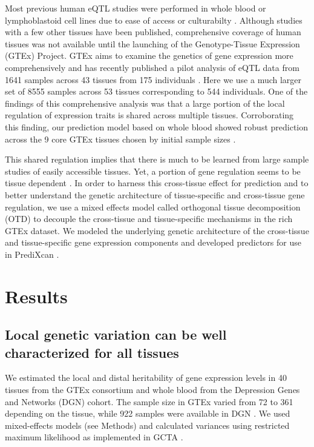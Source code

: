 \documentclass[10pt,letterpaper]{article}
\begin{document}
Most previous human eQTL studies were performed in whole blood or lymphoblastoid cell lines due to ease of access or culturabilty \cite{Stranger_2007,Cheung_2005,Battle_2013}. Although studies with a few other tissues have been published, comprehensive coverage of human tissues was not available until the launching of the Genotype-Tissue Expression (GTEx) Project. GTEx aims to examine the genetics of gene expression more comprehensively and has recently published a pilot analysis of eQTL data from 1641 samples across 43 tissues from 175 individuals \cite{Ardlie_2015}. Here we use a much larger set of 8555 samples across 53 tissues corresponding to 544 individuals. One of the findings of this comprehensive analysis was that a large portion of the local regulation of expression traits is shared across multiple tissues. Corroborating this finding, our prediction model based on whole blood showed robust prediction across the 9 core GTEx tissues chosen by initial sample sizes \cite{Gamazon_2015}.

This shared regulation implies that there is much to be learned from large sample studies of easily accessible tissues. Yet, a portion of gene regulation seems to be tissue dependent \cite{Ardlie_2015}. In order to harness this cross-tissue effect for prediction and to better understand the genetic architecture of tissue-specific and cross-tissue gene regulation, we use a mixed effects model called orthogonal tissue decomposition (OTD) to decouple the cross-tissue and tissue-specific mechanisms in the rich GTEx dataset. We modeled the underlying genetic architecture of the cross-tissue and tissue-specific gene expression components and developed predictors for use in PrediXcan \cite{Gamazon_2015}.



\section*{Results}
\subsection*{Local genetic variation can be well characterized for all
tissues}\label{local-genetic-variation-can-be-well-characterized-for-all-tissues}

We estimated the local and distal heritability of gene expression levels in 40 tissues from the GTEx consortium and whole blood from the Depression Genes and Networks (DGN) cohort. The sample size in GTEx varied from 72 to 361 depending on the tissue, while 922 samples were available in DGN \cite{Battle_2013}. We used mixed-effects models (see Methods) and calculated variances using restricted maximum likelihood as implemented in GCTA \cite{Yang_2011}.
\end{document}
